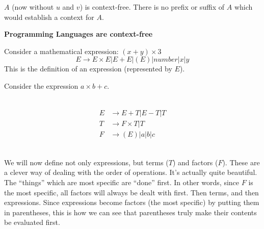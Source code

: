 \documentclass{scrartcl}
\begin{document}
$A$ (now without $u$ and $v$) is context-free. There is no prefix or suffix of $A$ which would establish a context for $A$.

\begin{center}
\textbf{Programming Languages are context-free}
\end{center}
Consider a mathematical expression: $(x+y)\times3$\\
$$E\rightarrow E\times E | E + E | (E) | number | x | y$$
This is the definition of an expression (represented by $E$).

Consider the expression $a\times b + c$.\\\ \\
\begin{minipage}{0.45\linewidth}
\begin{center}
\end{center}
\end{minipage}
\begin{minipage}{0.5\linewidth}
\begin{center}
\begin{align*}
E&\rightarrow E+T|E-T|T\\
T&\rightarrow F\times T|T\\
F&\rightarrow (E)|a|b|c
\end{align*}
\end{center}
\end{minipage}

\ \\We will now define not only expressions, but terms ($T$) and factors ($F$). 
These are a clever way of dealing with the order of operations. It's actually quite beautiful.
The ``things'' which are most specific are ``done'' first. In other words, since $F$ is the most specific, all factors will always be dealt with first. Then terms, and then expressions. Since expressions become factors (the most specific) by putting them in parentheses, this is how we can see that parentheses truly make their contents be evaluated first.
\begin{center}
\end{center}
\end{document}
